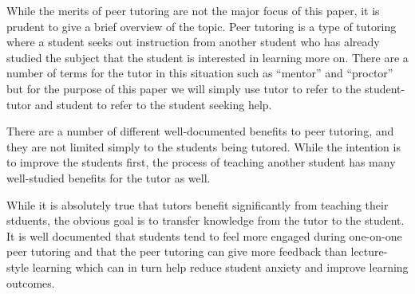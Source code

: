 While the merits of peer tutoring are not the major focus of this paper, it is
prudent to give a brief overview of the topic.  Peer tutoring is a type of
tutoring where a student seeks out instruction from another student who has
already studied the subject that the student is interested in learning more on.
There are a number of terms for the tutor in this situation such as ``mentor''
and ``proctor'' but for the purpose of this paper we will simply use tutor to
refer to the student-tutor and student to refer to the student seeking help. \cite{kim}

There are a number of different well-documented benefits to peer tutoring, and
they are not limited simply to the students being tutored.  While the intention
is to improve the students first, the process of teaching another student has
many well-studied benefits for the tutor as well. \cite{kim}

While it is absolutely true that tutors benefit significantly from teaching
their stduents, the obvious goal is to transfer knowledge from the tutor to the
student. It is well documented that students tend to feel more engaged during
one-on-one peer tutoring and that the peer tutoring can give more feedback than
lecture-style learning which can in turn help reduce student anxiety and improve
learning outcomes. \cite{topping}

